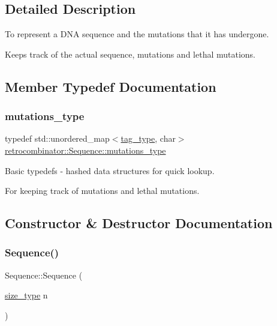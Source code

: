 \subsection{Detailed Description}
To represent a D\+NA sequence and the mutations that it has undergone. 

Keeps track of the actual sequence, mutations and lethal mutations. 

\subsection{Member Typedef Documentation}
\mbox{\label{classretrocombinator_1_1Sequence_a2abbaf2376f035a997e02c4afae9f476}} 
\subsubsection{\texorpdfstring{mutations\+\_\+type}{mutations\_type}}
{\footnotesize\ttfamily typedef std\+::unordered\+\_\+map$<$\hyperlink{namespaceretrocombinator_afd7c6eb4293e8c4d12827609a9a34b9b}{tag\+\_\+type}, char$>$ \hyperlink{classretrocombinator_1_1Sequence_a2abbaf2376f035a997e02c4afae9f476}{retrocombinator\+::\+Sequence\+::mutations\+\_\+type}\hspace{0.3cm}{\ttfamily [private]}}



Basic typedefs -\/ hashed data structures for quick lookup. 

For keeping track of mutations and lethal mutations. 

\subsection{Constructor \& Destructor Documentation}
\mbox{\label{classretrocombinator_1_1Sequence_a04d0d6977316f2ab30844e584c4531ec}} 
\subsubsection{\texorpdfstring{Sequence()}{Sequence()}\hspace{0.1cm}{\footnotesize\ttfamily [1/3]}}
{\footnotesize\ttfamily Sequence\+::\+Sequence (\begin{DoxyParamCaption}\item[{\hyperlink{namespaceretrocombinator_a8e1541b50cee66a791df4c437ccbb385}{size\+\_\+type}}]{n }\end{DoxyParamCaption})}



